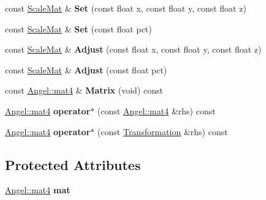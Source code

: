 \begin{DoxyCompactItemize}
\item 
\hypertarget{class_scale_mat_aa72e3e61eddd0e88092e6cc76cc78972}{const \hyperlink{class_scale_mat}{Scale\-Mat} \& {\bfseries Set} (const float x, const float y, const float z)}\label{class_scale_mat_aa72e3e61eddd0e88092e6cc76cc78972}

\item 
\hypertarget{class_scale_mat_aea523b732204366c105809fc447ff07e}{const \hyperlink{class_scale_mat}{Scale\-Mat} \& {\bfseries Set} (const float pct)}\label{class_scale_mat_aea523b732204366c105809fc447ff07e}

\item 
\hypertarget{class_scale_mat_ad259370ba433114d9cdbd9d817552905}{const \hyperlink{class_scale_mat}{Scale\-Mat} \& {\bfseries Adjust} (const float x, const float y, const float z)}\label{class_scale_mat_ad259370ba433114d9cdbd9d817552905}

\item 
\hypertarget{class_scale_mat_af915563091d994e41c309a2bcd31615e}{const \hyperlink{class_scale_mat}{Scale\-Mat} \& {\bfseries Adjust} (const float pct)}\label{class_scale_mat_af915563091d994e41c309a2bcd31615e}

\item 
\hypertarget{class_transformation_ae6a57a1ee74ca1da1b8aef3d328a8772}{const \hyperlink{class_angel_1_1mat4}{Angel\-::mat4} \& {\bfseries Matrix} (void) const }\label{class_transformation_ae6a57a1ee74ca1da1b8aef3d328a8772}

\item 
\hypertarget{class_transformation_afdfbf48815a5b0d885f3b93f04cd2c66}{\hyperlink{class_angel_1_1mat4}{Angel\-::mat4} {\bfseries operator$\ast$} (const \hyperlink{class_angel_1_1mat4}{Angel\-::mat4} \&rhs) const }\label{class_transformation_afdfbf48815a5b0d885f3b93f04cd2c66}

\item 
\hypertarget{class_transformation_a85b923e0066365ef2e4aec3671396410}{\hyperlink{class_angel_1_1mat4}{Angel\-::mat4} {\bfseries operator$\ast$} (const \hyperlink{class_transformation}{Transformation} \&rhs) const }\label{class_transformation_a85b923e0066365ef2e4aec3671396410}

\end{DoxyCompactItemize}
\subsection*{Protected Attributes}
\begin{DoxyCompactItemize}
\item 
\hypertarget{class_transformation_a5f39fb578a1cdf78ca85efbd932d3834}{\hyperlink{class_angel_1_1mat4}{Angel\-::mat4} {\bfseries mat}}\label{class_transformation_a5f39fb578a1cdf78ca85efbd932d3834}

\end{DoxyCompactItemize}


